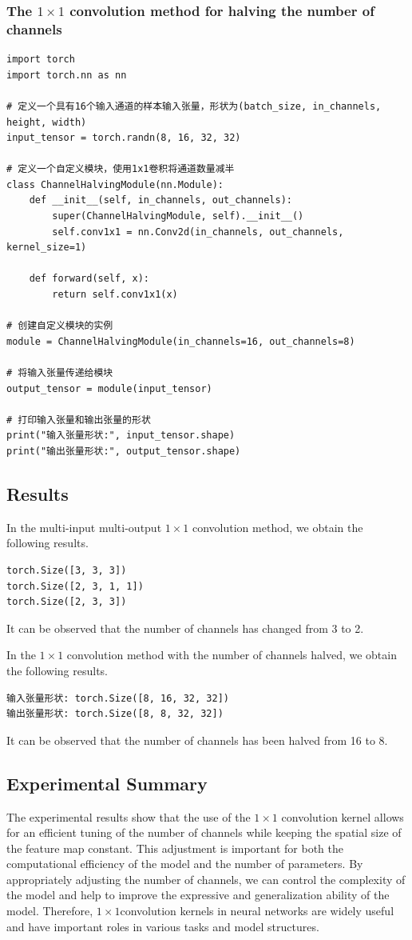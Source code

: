 \documentclass[a4paper,12pt]{article}
\begin{document}
\subsubsection{The $1 \times 1$ convolution method for halving the number of channels}
\begin{lstlisting}
import torch
import torch.nn as nn

# 定义一个具有16个输入通道的样本输入张量，形状为(batch_size, in_channels, height, width)
input_tensor = torch.randn(8, 16, 32, 32)

# 定义一个自定义模块，使用1x1卷积将通道数量减半
class ChannelHalvingModule(nn.Module):
    def __init__(self, in_channels, out_channels):
        super(ChannelHalvingModule, self).__init__()
        self.conv1x1 = nn.Conv2d(in_channels, out_channels, kernel_size=1)

    def forward(self, x):
        return self.conv1x1(x)

# 创建自定义模块的实例
module = ChannelHalvingModule(in_channels=16, out_channels=8)

# 将输入张量传递给模块
output_tensor = module(input_tensor)

# 打印输入张量和输出张量的形状
print("输入张量形状:", input_tensor.shape)
print("输出张量形状:", output_tensor.shape)
\end{lstlisting}

\subsection{Results}
In the multi-input multi-output $1 \times 1$ convolution method, we obtain the following results.
\begin{lstlisting}
torch.Size([3, 3, 3])
torch.Size([2, 3, 1, 1])
torch.Size([2, 3, 3])
\end{lstlisting}
It can be observed that the number of channels has changed from 3 to 2.

In the $1 \times 1$ convolution method with the number of channels halved, we obtain the following results.
\begin{lstlisting}
输入张量形状: torch.Size([8, 16, 32, 32])
输出张量形状: torch.Size([8, 8, 32, 32])
\end{lstlisting}
It can be observed that the number of channels has been halved from 16 to 8.

\subsection{Experimental Summary}
The experimental results show that the use of the $1 \times 1$ convolution kernel allows for an efficient tuning of the number of channels while keeping the spatial size of the feature map constant. This adjustment is important for both the computational efficiency of the model and the number of parameters. By appropriately adjusting the number of channels, we can control the complexity of the model and help to improve the expressive and generalization ability of the model. Therefore, $1 \times 1$convolution kernels in neural networks are widely useful and have important roles in various tasks and model structures.
\end{document}
